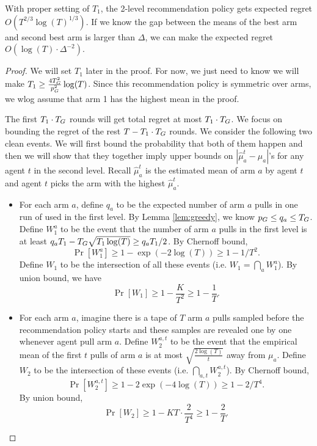 \begin{theorem}
\label{thm:2level}
With proper setting of $T_1$, the 2-level recommendation policy gets expected regret $O(T^{2/3} \log(T)^{1/3})$. If we know the gap between the means of the best arm and second best arm is larger than $\Delta$, we can make the expected regret $O(\log(T) \cdot \Delta^{-2})$. 
\end{theorem}

\begin{proof}
We will set $T_1$ later in the proof. For now, we just need to know we will make $T_1 \geq \frac{4T_G^2}{p_G^2}\log(T)$. Since this recommendation policy is symmetric over arms, we wlog assume that arm 1 has the highest mean in the proof.

The first $T_1 \cdot T_G$ rounds will get total regret at most $T_1 \cdot T_G$.  We focus on bounding the regret of the rest $T - T_1 \cdot T_G$ rounds. We consider the following two clean events. We will first bound the probability that both of them happen and then we will show that they together imply upper bounds on $|\hat{\mu}^t_a - \mu_a|$'s for any agent $t$ in the second level. Recall $\hat{\mu}^t_a$ is the estimated mean of arm $a$ by agent $t$ and agent $t$ picks the arm with the highest $\hat{\mu}^t_a$.

\begin{itemize}
\item For each arm $a$, define $q_a$ to be the expected number of arm $a$ pulls in one run of \ALGG used in the first level. By Lemma \ref{lem:greedy}, we know $p_G \leq q_a \leq T_G$. Define $W_1^a$ to be the event that the number of arm $a$ pulls in the first level is at least $q_a T_1- T_G \sqrt{T_1\log(T)} \geq q_a T_1 / 2$. By Chernoff bound,
\[
\Pr[W_1^a] \geq 1-\exp(-2\log(T)) \geq 1-1/T^2.
\]
Define $W_1$ to be the intersection of all these events (i.e. $W_1 = \bigcap_{a}W_1^a$). By union bound, we have
\[
\Pr[W_1] \geq 1- \frac{K}{T^2} \geq 1 - \frac{1}{T}.
\]
\item For each arm $a$, imagine there is a tape of $T$ arm $a$ pulls sampled before the recommendation policy starts and these samples are revealed one by one whenever agent pull arm $a$. Define $W^{a,t}_2$ to be the event that the empirical mean of the first $t$ pulls of arm $a$ is at most $\sqrt{\frac{2\log(T)}{t}}$ away from $\mu_a$. Define $W_2$ to be the intersection of these events (i.e. $\bigcap_{a,t} W^{a,t}_2$).
By Chernoff bound,
\[
\Pr[W^{a,t}_2] \geq 1 - 2\exp(-4\log(T)) \geq 1-2/T^4.
\]
By union bound, 
\[
\Pr[W_2] \geq 1 - KT \cdot \frac{2}{T^4} \geq 1 - \frac{2}{T}.
\]
\end{itemize}


\end{proof}

